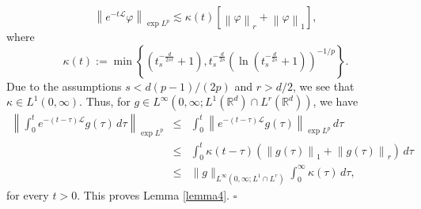 \documentclass[a4paper,11pt]{amsart}
\numberwithin{equation}{section}
\theoremstyle{plain}
\theoremstyle{definition}
\begin{document}
$$\left\|e^{-t\mathcal{L}} \varphi\right\|_{\exp L^p}\lesssim \kappa(t)\left[\left\|\varphi\right\|_{r}+\left\|\varphi\right\|_{1}\right],$$
where 
$$\kappa(t):=\min\left\{(t_s^{-\frac{d}{2 s r}}+1),t_s^{-\frac{d}{2 s }}\left(\ln( t_s^{-\frac{d}{2 s}}+1)\right)^{-1/p}\right\}.$$
Due to the assumptions $s<d(p-1)/(2 p)$ and $r>d/2$, we see that $\kappa\in L^1(0,\infty)$. Thus, for $g\in L^\infty(0,\infty;L^1(\mathbb{R}^d)\cap L^r(\mathbb{R}^d))$, we have
\begin{eqnarray*}
\left\|\int_0^te^{-(t-\tau)\mathcal{L}} g(\tau)\,d\tau\right\|_{\exp L^p}&\leq& \int_0^t\left\|e^{-(t-\tau)\mathcal{L}} g(\tau)\right\|_{\exp L^p}\,d\tau\\
&\leq& \int_0^t\kappa(t-\tau)\left(\left\|g(\tau)\right\|_{1}+\left\|g(\tau)\right\|_{r}\right)\,d\tau\\
&\leq&\|g\|_{L^\infty(0,\infty;L^1\cap L^r)} \int_0^\infty\kappa(\tau)\,d\tau,
\end{eqnarray*}
for every $t>0$. This proves Lemma \ref{lemma4}. \hfill$\square$\\
\end{document}
